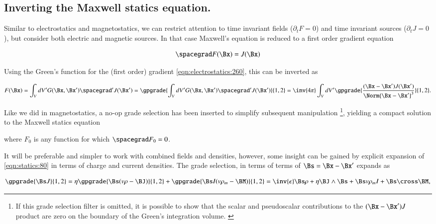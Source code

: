 %
%
\subsection{Inverting the Maxwell statics equation.}

Similar to electrostatics and magnetostatics, we can restrict attention to time invariant fields (\( \partial_t F = 0\)) and time invariant sources (\(\partial_t J = 0\)), but consider both electric and magnetic sources.  In that case Maxwell's equation is reduced to a first order gradient equation

\begin{dmath}\label{eqn:statics:20}
\spacegrad F(\Bx) = J(\Bx)
\end{dmath}

Using the Green's function for the (first order) gradient \cref{eqn:electrostatics:260}, this can be inverted as

\begin{dmath}\label{eqn:statics:40}
F(\Bx)
= \int_V dV' G(\Bx, \Bx') \spacegrad' J(\Bx')
= \gpgrade{\int_V dV' G(\Bx, \Bx') \spacegrad' J(\Bx')}{1,2}
= \inv{4\pi} \int_V dV' \gpgrade{\frac{(\Bx - \Bx') J(\Bx')}{\Norm{\Bx - \Bx'}^3} }{1,2}.
\end{dmath}

Like we did in magnetostatics, a no-op grade selection has been inserted to simplify subsequent manipulation
\footnote{If this grade selection filter is omitted, it is possible to show that the scalar and pseudoscalar contributions to the \( (\Bx -\Bx') J \) product are zero on the boundary of the Green's integration volume. \citep{jancewicz1988multivectors:appendixI}},
yielding a compact solution to the Maxwell statics equation


where \( F_0 \) is any function for which \( \spacegrad F_0 = 0 \).

It will be preferable and simpler to work with combined fields and densities, however, some insight can be gained by
explicit expansion of \cref{eqn:statics:80} in terms of charge and current densities.
The grade selection, in terms of terms of \( \Bs = \Bx -\Bx' \) expands as

\begin{dmath}\label{eqn:statics:60}
\gpgrade{\Bs J}{1,2}
=
\eta \gpgrade{\Bs (v \rho - \BJ)}{1,2}
+
\gpgrade{\Bs I(v \rho_m - \BM)}{1,2}
=
\inv{\epsilon} \Bs \rho + \eta \BJ \wedge \Bs + \Bs v \rho_m I + \Bs \cross \BM,
\end{dmath}

